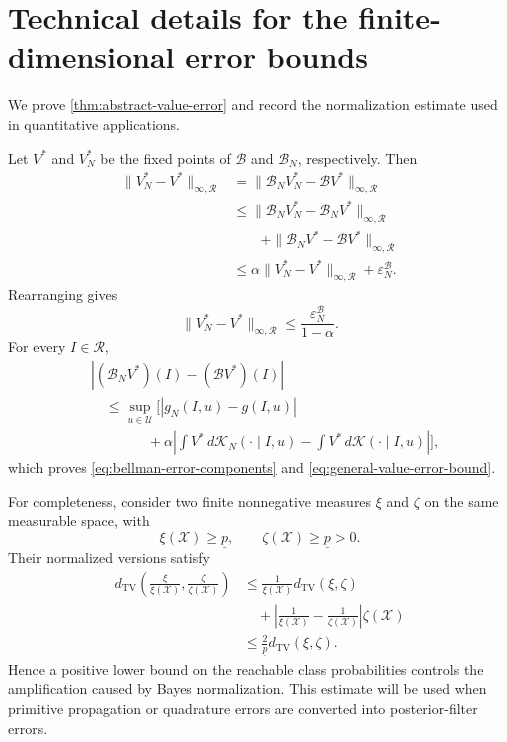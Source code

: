 \documentclass[10pt,twocolumn]{article}
\theoremstyle{remark}
\newcommand{\Ucal}{\mathcal{U}}
\newcommand{\Xcal}{\mathcal{X}}
\begin{document}

\section{Technical details for the finite-dimensional error bounds}
\label{app:finite-dimensional-error-bounds}

We prove \cref{thm:abstract-value-error} and record the normalization estimate used in quantitative applications.

Let \(V^*\) and \(V_N^*\) be the fixed points of \(\mathcal B\) and \(\mathcal B_N\), respectively. Then
\[
\begin{aligned}
	\|V_N^*-V^*\|_{\infty,\mathcal{R}}
	&=
	\|\mathcal B_NV_N^*-\mathcal BV^*\|_{\infty,\mathcal{R}}
	\\
	&\leq
	\|\mathcal B_NV_N^*-\mathcal B_NV^*\|_{\infty,\mathcal{R}} \\
	& \qquad +
	\|\mathcal B_NV^*-\mathcal BV^*\|_{\infty,\mathcal{R}}
	\\
	&\leq
	\alpha\|V_N^*-V^*\|_{\infty,\mathcal{R}}
	+
	\varepsilon_N^{\mathcal B}.
\end{aligned}
\]
Rearranging gives
\[
\|V_N^*-V^*\|_{\infty,\mathcal{R}}
\leq
\frac{\varepsilon_N^{\mathcal B}}{1-\alpha}.
\]
For every \(I\in \mathcal{R}\),
\[
\begin{aligned}
	&|(\mathcal B_NV^*)(I)-(\mathcal BV^*)(I)|
	\\
	&\quad\leq
	\sup_{u\in\Ucal}
	\Bigg[
	|g_N(I,u)-g(I,u)|
	\\
	&\qquad\qquad+
	\alpha
	\left|
	\int V^*\,d\mathcal K_N(\cdot\mid I,u)
	-
	\int V^*\,d\mathcal K(\cdot\mid I,u)
	\right|
	\Bigg],
\end{aligned}
\]
which proves \cref{eq:bellman-error-components} and \cref{eq:general-value-error-bound}.

For completeness, consider two finite nonnegative measures \(\xi\) and \(\zeta\) on the same measurable space, with
\[
\xi(\Xcal)\geq\underline p,
\qquad
\zeta(\Xcal)\geq\underline p>0.
\]
Their normalized versions satisfy
\[
\begin{aligned}
	d_{\mathrm{TV}}
	\left(
	\frac{\xi}{\xi(\Xcal)},
	\frac{\zeta}{\zeta(\Xcal)}
	\right)
	&\leq
	\frac{1}{\xi(\Xcal)}
	d_{\mathrm{TV}}(\xi,\zeta)
	\\
	&\quad+
	\left|
	\frac{1}{\xi(\Xcal)}
	-
	\frac{1}{\zeta(\Xcal)}
	\right|
	\zeta(\Xcal)
	\\
	&\leq
	\frac{2}{\underline p}
	d_{\mathrm{TV}}(\xi,\zeta).
\end{aligned}
\]
Hence a positive lower bound on the reachable class probabilities controls the amplification caused by Bayes normalization. This estimate will be used when primitive propagation or quadrature errors are converted into posterior-filter errors.
\end{document}
